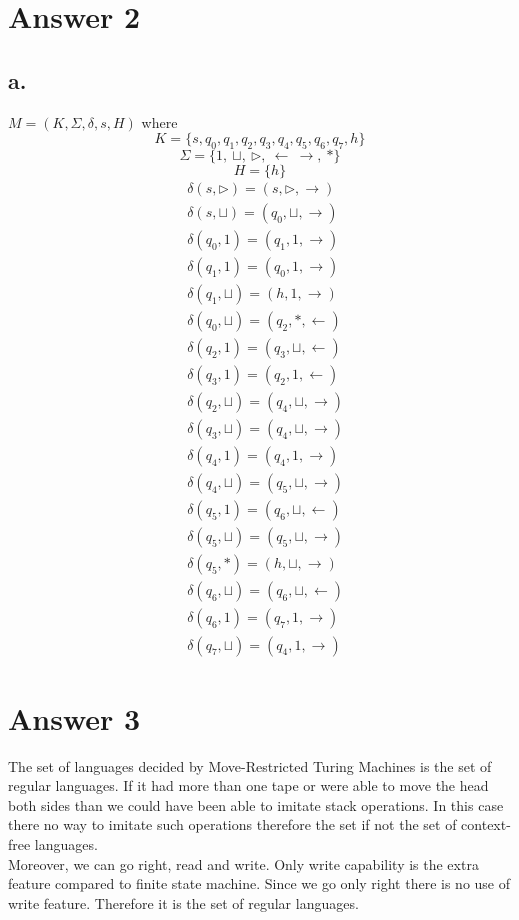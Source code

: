 \documentclass[12pt]{article}
\begin{document}
\section*{Answer 2}

\subsection*{a.}
$M=(K,\Sigma,\delta,s,H)$ where 
$$ K=\{s,q_0,q_1,q_2,q_3,q_4,q_5,q_6,q_7,h\} $$
$$ \Sigma = \{ 1,\ \sqcup,\ \triangleright,\ \leftarrow\ \rightarrow,\ *\}  $$
$$ H=\{ h \}  $$
\begin{equation}
\begin{split}
 & \delta(s,\triangleright)   = (s,\triangleright,\rightarrow) \\ 
 & \delta(s,\sqcup)   = (q_0,\sqcup,\rightarrow) \\ 
 & \delta(q_0,1)   = (q_1,1,\rightarrow) \\ 
 & \delta(q_1,1)   = (q_0,1,\rightarrow) \\ 
 & \delta(q_1,\sqcup)   = (h,1,\rightarrow) \\ 
 & \delta(q_0,\sqcup)   = (q_2,*,\leftarrow) \\ 
 & \delta(q_2,1)   = (q_3,\sqcup,\leftarrow) \\ 
 & \delta(q_3,1)   = (q_2,1,\leftarrow) \\ 
 & \delta(q_2,\sqcup)   = (q_4,\sqcup,\rightarrow) \\ 
 & \delta(q_3,\sqcup)   = (q_4,\sqcup,\rightarrow) \\ 
 & \delta(q_4,1)   = (q_4,1,\rightarrow) \\ 
 & \delta(q_4,\sqcup)   = (q_5,\sqcup,\rightarrow) \\ 
 & \delta(q_5,1)   = (q_6,\sqcup,\leftarrow) \\ 
 & \delta(q_5,\sqcup)   = (q_5,\sqcup,\rightarrow) \\ 
 & \delta(q_5,*)   = (h,\sqcup,\rightarrow) \\ 
 & \delta(q_6,\sqcup)   = (q_6,\sqcup,\leftarrow) \\ 
 & \delta(q_6,1)   = (q_7,1,\rightarrow) \\ 
 & \delta(q_7,\sqcup)   = (q_4,1,\rightarrow) 
\end{split}
\end{equation}

\section*{Answer 3}
The set of languages decided by Move-Restricted Turing Machines is the set of regular languages. If it had more than one tape or were able to move the head both sides than we could have been able to imitate stack operations. In this case there no way to imitate such operations therefore the set if not the set of context-free languages. \\
Moreover, we can go right, read and write. Only write capability is the extra feature compared to finite state machine. Since we go only right there is no use of write feature. Therefore it is the set of regular languages.
\end{document}
